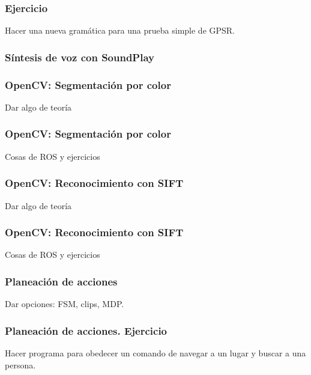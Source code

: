 \documentclass[10pt,spanish,aspectratio=1610]{beamer}
\begin{document}
\begin{frame}\frametitle{Ejercicio}
  Hacer una nueva gramática para una prueba simple de GPSR.
  
\end{frame}

\begin{frame}\frametitle{Síntesis de voz con SoundPlay}
  
\end{frame}

\begin{frame}\frametitle{OpenCV: Segmentación por color}
  Dar algo de teoría
\end{frame}

\begin{frame}\frametitle{OpenCV: Segmentación por color}
  Cosas de ROS y ejercicios
\end{frame}

\begin{frame}\frametitle{OpenCV: Reconocimiento con SIFT}
  Dar algo de teoría
\end{frame}

\begin{frame}\frametitle{OpenCV: Reconocimiento con SIFT}
  Cosas de ROS y ejercicios
\end{frame}

\begin{frame}\frametitle{Planeación de acciones}
Dar opciones: FSM, clips, MDP.  
\end{frame}

\begin{frame}\frametitle{Planeación de acciones. Ejercicio}
Hacer programa para obedecer un comando de navegar a un lugar y buscar a una persona.
\end{frame}
\end{document}
